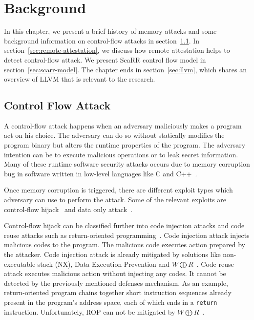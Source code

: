 
\chapter{Background} %

\label{Chapter3} %

In this chapter, we present a brief history of memory attacks and some
background information on control-flow attacks in
section~\ref{sec:control-flow-attack}. In section~\ref{sec:remote-attestation},
we discuss how remote attestation helps to detect control-flow attack. We
present ScaRR control flow model in section~\ref{sec:scarr-model}. The chapter
ends in section~\ref{sec:llvm}, which shares an overview of LLVM that is
relevant to the research. 

\section{Control Flow Attack}
\label{sec:control-flow-attack}

A control-flow attack happens when an adversary maliciously makes a program act
on his choice. The adversary can do so without statically modifies the program
binary but alters the runtime properties of the program. The adversary intention
can be to execute malicious operations or to leak secret information. Many of
these runtime software security attacks occurs due to memory corruption bug
in software written in low-level languages like C and
C++~\cite{szekeresSoKEternalWar2013}.

Once memory corruption is triggered, there are different exploit types which
adversary can use to perform the attack. Some of the relevant exploits are
control-flow hijack~\cite{shachamGeometryInnocentFlesh2007,
schusterCounterfeitObjectorientedProgramming2015}  and data only
attack~\cite{chenNonControlDataAttacksAre2005,
carliniControlFlowBendingEffectiveness2015}. 

Control-flow hijack can be classified further into code injection attacks and
code reuse attacks such as return-oriented
programming~\cite{roemerReturnorientedProgrammingSystems2012}. Code injection
attack injects malicious codes to the program. The malicious code executes
action prepared by the attacker. Code injection attack is already mitigated by
solutions like non-executable stack (NX), Data Execution Prevention and \( W
\bigoplus R \)~\cite{vanderveenMemoryErrorsPresent2012}. Code reuse attack
executes malicious action without injecting any codes. It cannot be detected by
the previously mentioned defenses mechanism. As an example, return-oriented
program chains together short instruction sequences already present in the
program’s address space, each of which ends in a \texttt{return} instruction.
Unfortunately, ROP can not be mitigated by \( W \bigoplus R
\)~\cite{roemerReturnorientedProgrammingSystems2012}.

